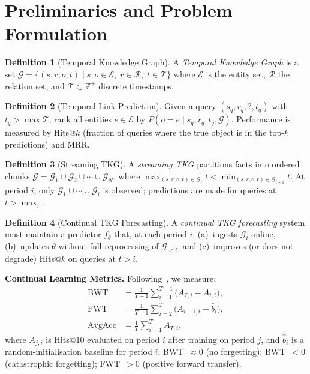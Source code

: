 \documentclass[10pt,twocolumn]{article}
\theoremstyle{definition}
\newtheorem{definition}{Definition}
\newcommand{\calG}{\mathcal{G}}
\newcommand{\calE}{\mathcal{E}}
\newcommand{\calR}{\mathcal{R}}
\newcommand{\calT}{\mathcal{T}}
\begin{document}
\section{Preliminaries and Problem Formulation}
\label{sec:prelim}

\begin{definition}[Temporal Knowledge Graph]
A \emph{Temporal Knowledge Graph} is a set
$\calG = \{(s, r, o, t) \mid s, o \in \calE,\; r \in \calR,\; t \in \calT\}$
where $\calE$ is the entity set, $\calR$ the relation set, and
$\calT \subset \mathbb{Z}^+$ discrete timestamps.
\end{definition}

\begin{definition}[Temporal Link Prediction]
Given a query $(s_q, r_q, ?, t_q)$ with $t_q > \max\calT$, rank all entities
$e \in \calE$ by $P(o = e \mid s_q, r_q, t_q, \calG)$.
Performance is measured by Hits@$k$ (fraction of queries where the true
object is in the top-$k$ predictions) and MRR.
\end{definition}

\begin{definition}[Streaming TKG]
A \emph{streaming TKG} partitions facts into ordered chunks
$\calG = \calG_1 \cup \calG_2 \cup \cdots \cup \calG_N$, where
$\max_{(s,r,o,t)\in\calG_i} t < \min_{(s,r,o,t)\in\calG_{i+1}} t$.
At period $i$, only $\calG_1 \cup \cdots \cup \calG_i$ is observed;
predictions are made for queries at $t > \max_i$.
\end{definition}

\begin{definition}[Continual TKG Forecasting]
A \emph{continual TKG forecasting} system must maintain a predictor $f_\theta$
that, at each period $i$, (a)~ingests $\calG_i$ online, (b)~updates $\theta$
without full reprocessing of $\calG_{<i}$, and (c)~improves (or does not
degrade) Hits@$k$ on queries at $t > i$.
\end{definition}

\medskip
\noindent\textbf{Continual Learning Metrics.}\quad
Following~\citet{Lopez2017gem}, we measure:
\begin{align}
\text{BWT} &= \frac{1}{T-1}\sum_{i=1}^{T-1}
              \bigl(A_{T,i} - A_{i,i}\bigr), \label{eq:bwt}\\
\text{FWT} &= \frac{1}{T-1}\sum_{i=2}^{T}
              \bigl(A_{i-1,i} - \hat{b}_i\bigr), \label{eq:fwt}\\
\text{AvgAcc} &= \frac{1}{T}\sum_{i=1}^{T} A_{T,i}, \label{eq:avgacc}
\end{align}
where $A_{j,i}$ is Hits@10 evaluated on period $i$ after training on period
$j$, and $\hat{b}_i$ is a random-initialisation baseline for period $i$.
BWT~$\approx 0$ (no forgetting); BWT~$< 0$ (catastrophic forgetting);
FWT~$> 0$ (positive forward transfer).
\end{document}
